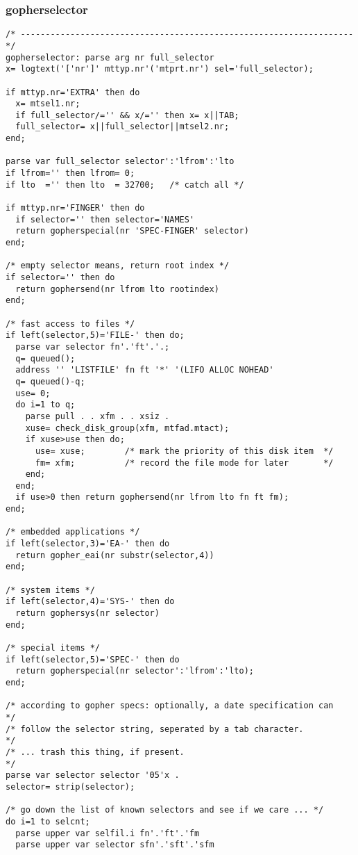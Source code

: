 \subsubsection{gopherselector}

\def\LPtopF{gopherselector}

\begin{verbatim}
/* ------------------------------------------------------------------- */
gopherselector: parse arg nr full_selector
x= logtext('['nr']' mttyp.nr'('mtprt.nr') sel='full_selector);

if mttyp.nr='EXTRA' then do
  x= mtsel1.nr;
  if full_selector/='' && x/='' then x= x||TAB;
  full_selector= x||full_selector||mtsel2.nr;
end;

parse var full_selector selector':'lfrom':'lto
if lfrom='' then lfrom= 0;
if lto  ='' then lto  = 32700;   /* catch all */

if mttyp.nr='FINGER' then do
  if selector='' then selector='NAMES'
  return gopherspecial(nr 'SPEC-FINGER' selector)
end;

/* empty selector means, return root index */
if selector='' then do
  return gophersend(nr lfrom lto rootindex)
end;

/* fast access to files */
if left(selector,5)='FILE-' then do;
  parse var selector fn'.'ft'.'.;
  q= queued();
  address '' 'LISTFILE' fn ft '*' '(LIFO ALLOC NOHEAD'
  q= queued()-q;
  use= 0;
  do i=1 to q;
    parse pull . . xfm . . xsiz .
    xuse= check_disk_group(xfm, mtfad.mtact);
    if xuse>use then do;
      use= xuse;        /* mark the priority of this disk item  */
      fm= xfm;          /* record the file mode for later       */
    end;
  end;
  if use>0 then return gophersend(nr lfrom lto fn ft fm);
end;

/* embedded applications */
if left(selector,3)='EA-' then do
  return gopher_eai(nr substr(selector,4))
end;

/* system items */
if left(selector,4)='SYS-' then do
  return gophersys(nr selector)
end;

/* special items */
if left(selector,5)='SPEC-' then do
  return gopherspecial(nr selector':'lfrom':'lto);
end;

/* according to gopher specs: optionally, a date specification can     */
/* follow the selector string, seperated by a tab character.           */
/* ... trash this thing, if present.                                   */
parse var selector selector '05'x .
selector= strip(selector);

/* go down the list of known selectors and see if we care ... */
do i=1 to selcnt;
  parse upper var selfil.i fn'.'ft'.'fm
  parse upper var selector sfn'.'sft'.'sfm


\end{verbatim}
